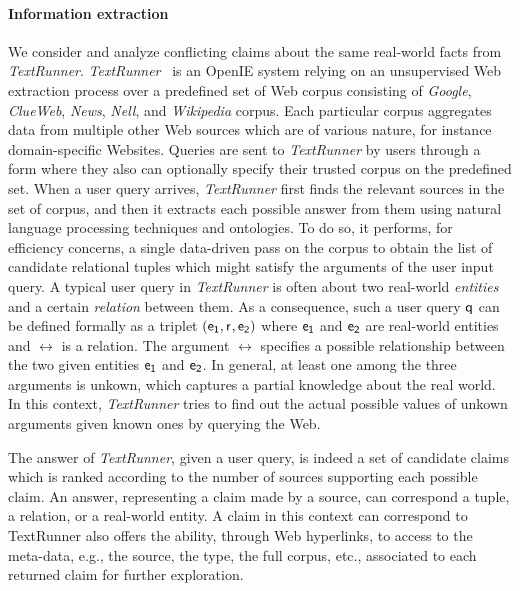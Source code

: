 \paragraph*{Information extraction} We consider and analyze 
conflicting claims about the same real-world facts from \emph{TextRunner}.
\emph{TextRunner}~\cite{Yates07, Etzioni08} is an OpenIE system relying
on an unsupervised Web extraction process over a predefined 
set of Web corpus consisting of \emph{Google}, \emph{ClueWeb}, \emph{News}, \emph{Nell}, and 
\emph{Wikipedia} corpus. Each particular corpus aggregates data from multiple 
other Web sources which are of various nature, for instance domain-specific Websites.
Queries are sent to \emph{TextRunner} by users through a form where 
they also can optionally specify their trusted corpus on the predefined set.
When a user query arrives, \emph{TextRunner} first finds the relevant
sources in the set of corpus, and then it extracts each possible answer from them
using natural language processing techniques and ontologies. 
To do so, it performs, for efficiency concerns, a single data-driven
pass on the corpus to obtain the list of candidate relational tuples 
which might satisfy the arguments of the user input query. 
A typical user query in \emph{TextRunner} is often about 
two real-world \emph{entities} and a certain \emph{relation} between them.
As a consequence, such a user query $\mathsf{q}$ can be defined formally as a triplet $(\mathsf{e_{1}}, \mathsf{r}_{}, \mathsf{e_{2}})$
where $\mathsf{e_{1}}$ and $\mathsf{e_{2}}$ are real-world entities and $\rel{}$ is a relation. The argument $\rel{}$ 
specifies a possible relationship between the two given entities $\mathsf{e_{1}}$ and $\mathsf{e_{2}}$. In general,
at least one among the three arguments is unkown, which captures a partial knowledge about the real world. 
In this context, \emph{TextRunner} tries to find out the actual possible values of unkown arguments given 
known ones by querying the Web.

The answer of \emph{TextRunner}, given a user query, is indeed a set of candidate claims 
which is ranked according to the number of sources supporting each possible claim. An answer, representing a claim made by a source, can correspond
a tuple, a relation, or a real-world entity.
A claim in this context can correspond to  TextRunner also offers the ability, through Web hyperlinks, 
to access to the meta-data, e.g., the source, the type, the full corpus, etc., associated to each 
returned claim for further exploration. 


